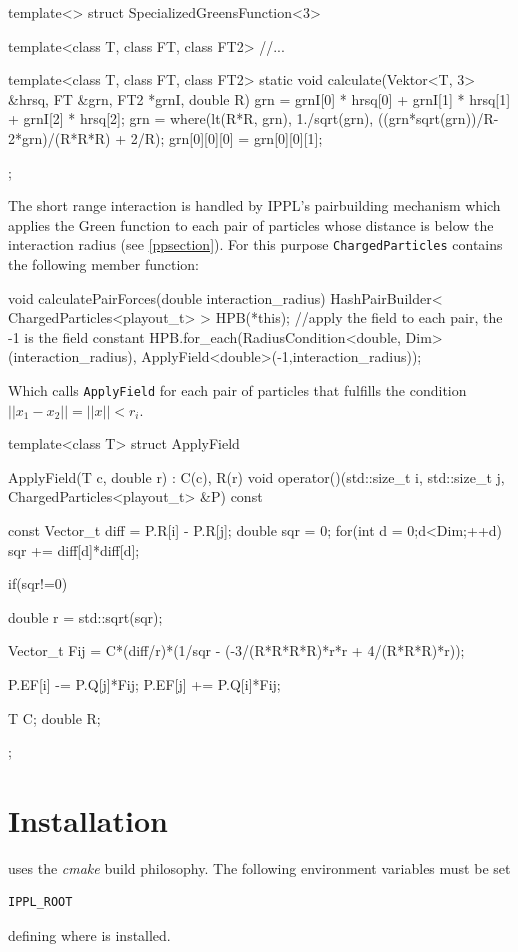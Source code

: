 \vspace{5mm}
\begin{code}
template<>
struct SpecializedGreensFunction<3> {
  template<class T, class FT, class FT2>
  //...

  template<class T, class FT, class FT2>
  static void calculate(Vektor<T, 3> &hrsq, FT &grn, FT2 *grnI, double R) {
    grn = grnI[0] * hrsq[0] + grnI[1] * hrsq[1] + grnI[2] * hrsq[2];
    grn = where(lt(R*R, grn), 1./sqrt(grn),
		((grn*sqrt(grn))/R-2*grn)/(R*R*R) + 2/R);
    grn[0][0][0] = grn[0][0][1];
  }   
};
\end{code}
\vspace{5mm}
The short range interaction is handled by IPPL's pairbuilding mechanism which applies
the Green function to each pair of particles whose distance is below the
interaction radius (see \ref{ppsection}). For this purpose \texttt{ChargedParticles} contains the following member
function:


\vspace{5mm}
\begin{code}
  void calculatePairForces(double interaction_radius)
  {
    HashPairBuilder< ChargedParticles<playout_t> > HPB(*this);
    //apply the field to each pair, the -1 is the field constant
    HPB.for_each(RadiusCondition<double, Dim>(interaction_radius), 
    			   ApplyField<double>(-1,interaction_radius));
  }
\end{code}
\vspace{5mm}
Which calls \texttt{ApplyField} for each pair of particles that fulfills the condition $||x_1-x_2|| = ||x|| <r_i$.
\clearpage
\pagebreak
\vspace{5mm}
\begin{code}
template<class T>
struct ApplyField {
  ApplyField(T c, double r) : C(c), R(r) {}
  void operator()(std::size_t i, std::size_t j, ChargedParticles<playout_t> &P) const
  {
    const Vector_t diff = P.R[i] - P.R[j];
    double sqr = 0;
    for(int d = 0;d<Dim;++d)
      sqr += diff[d]*diff[d];
		
     if(sqr!=0)
      {
	double r = std::sqrt(sqr);
	
	Vector_t Fij = C*(diff/r)*(1/sqr - (-3/(R*R*R*R)*r*r + 4/(R*R*R)*r));

	P.EF[i] -= P.Q[j]*Fij;
	P.EF[j] += P.Q[i]*Fij;
      }
  }
  T C;
  double R;
};
\end{code}

\section{Installation}
 \ippl uses the {\em cmake } build philosophy.  The following environment variables must be set
\begin{verbatim}
IPPL_ROOT
\end{verbatim} 
defining where \ippl is installed.

